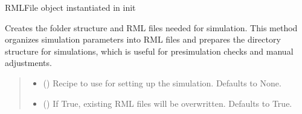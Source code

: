 \documentclass[letterpaper,10pt,english]{sphinxmanual}
\begin{document}
\begin{fulllineitems}
\begin{fulllineitems}
\label{\detokenize{API:raypyng.simulate.Simulate.rml}}
\pysigstartsignatures
\pysigline
{}
\pysigstopsignatures
\sphinxAtStartPar
RMLFile object instantiated in init

\end{fulllineitems}


\begin{fulllineitems}
\label{\detokenize{API:raypyng.simulate.Simulate.rml_list}}
\pysigstartsignatures
\pysiglinewithargsret
{}
{\sphinxparamcomma {}}
{}
\pysigstopsignatures
\sphinxAtStartPar
Creates the folder structure and RML files needed for simulation.
This method organizes simulation parameters into RML files and prepares
the directory structure for simulations, which is useful for
pre\sphinxhyphen{}simulation checks and manual adjustments.
\begin{quote}\begin{description}
\begin{itemize}
\item {} 
\sphinxAtStartPar
{} (\sphinxstyleliteralemphasis{\sphinxupquote{, }}) \textendash{} Recipe to use for setting
up the simulation. Defaults to None.

\item {} 
\sphinxAtStartPar
{} (\sphinxstyleliteralemphasis{\sphinxupquote{, }}) \textendash{} If True, existing RML files will be overwritten.
Defaults to True.

\end{itemize}

\end{description}\end{quote}

\end{fulllineitems}


\end{fulllineitems}
\end{document}
